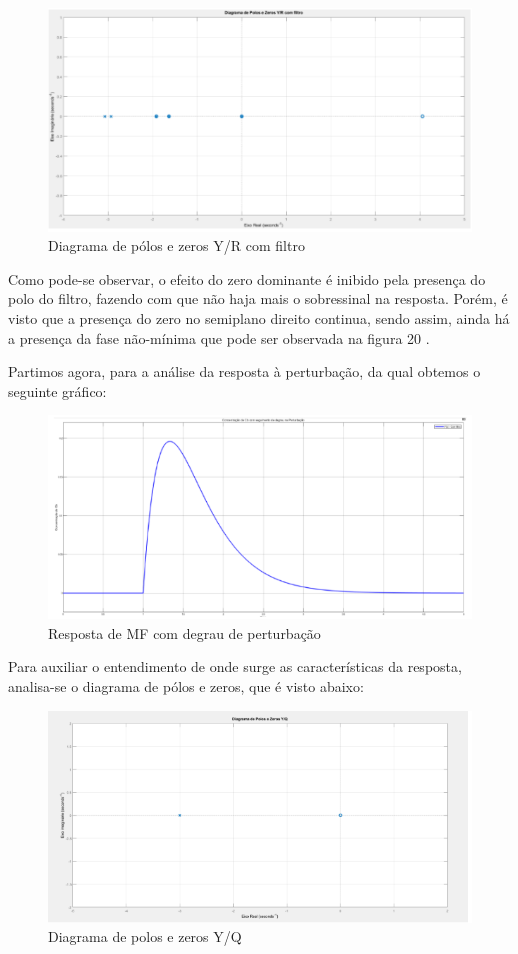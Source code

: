 \documentclass[a4paper,12pt]{report}
\begin{document}
\begin{figure}[H]
    \centering
    \includegraphics[width=0.8\linewidth]{Imagens/polo e zero com filtro.png}
    \caption{Diagrama de pólos e zeros Y/R com filtro}
    \label{fig:enter-label}
\end{figure}


Como pode-se observar, o efeito do zero dominante é inibido pela presença do polo do filtro, fazendo com que não haja mais o sobressinal na resposta. Porém, é visto que a presença do zero no semiplano direito continua, sendo assim, ainda há a presença da fase não-mínima que pode ser observada na figura 20 . 

Partimos agora, para a análise da resposta à perturbação, da qual obtemos o seguinte gráfico:

\begin{figure}[H]
    \centering
    \includegraphics[width=0.8\linewidth]{Imagens/resposta mf com degrau.png}
    \caption{Resposta de MF com degrau de perturbação}
    \label{fig:enter-label}
\end{figure}

Para auxiliar o entendimento de onde surge as características da resposta, analisa-se o diagrama de pólos e zeros, que é visto abaixo:

\begin{figure}[H]
    \centering
    \includegraphics[width=0.5\linewidth]{diagramapolosezeros.png}
    \caption{Diagrama de polos e zeros Y/Q }
    \label{fig:enter-label}
\end{figure}
\end{document}
